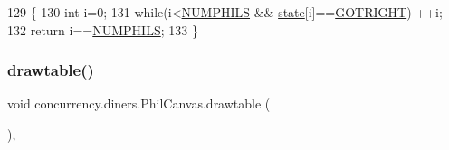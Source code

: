 \begin{DoxyCode}
129                         \{
130         \textcolor{keywordtype}{int} i=0;
131         \textcolor{keywordflow}{while}(i<\mbox{\hyperlink{classconcurrency_1_1diners_1_1_phil_canvas_a3eeb58e8b150bc1715a708ef38171fd5}{NUMPHILS}} && \mbox{\hyperlink{classconcurrency_1_1diners_1_1_phil_canvas_afe8fe2130ea9e415bdf1887ec73596c0}{state}}[i]==\mbox{\hyperlink{classconcurrency_1_1diners_1_1_phil_canvas_a4912c2b6fc26e79bd9ef5fbd8ab22e60}{GOTRIGHT}}) ++i;
132         \textcolor{keywordflow}{return} i==\mbox{\hyperlink{classconcurrency_1_1diners_1_1_phil_canvas_a3eeb58e8b150bc1715a708ef38171fd5}{NUMPHILS}};
133     \}
\end{DoxyCode}
\mbox{\label{classconcurrency_1_1diners_1_1_phil_canvas_a7d4dc4fa1339e653bdaabb4123522517}} 
\subsubsection{\texorpdfstring{drawtable()}{drawtable()}}
{\footnotesize\ttfamily void concurrency.\+diners.\+Phil\+Canvas.\+drawtable (\begin{DoxyParamCaption}{ }\end{DoxyParamCaption})\hspace{0.3cm}{\ttfamily [inline]}, {\ttfamily [package]}}


